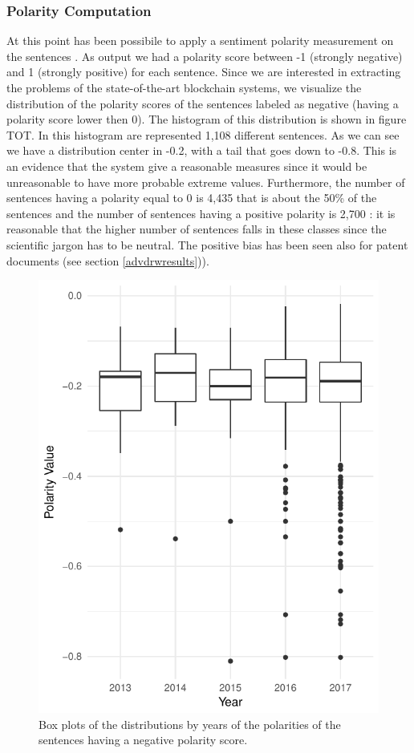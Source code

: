 \documentclass[]{book}
\begin{document}
\subsubsection*{Polarity Computation}\label{polarity-computation}

At this point has been possibile to apply a sentiment polarity
measurement on the sentences \citep{sentimentr2018}. As output we had a
polarity score between -1 (strongly negative) and 1 (strongly positive)
for each sentence. Since we are interested in extracting the problems of
the state-of-the-art blockchain systems, we visualize the distribution
of the polarity scores of the sentences labeled as negative (having a
polarity score lower then 0). The histogram of this distribution is
shown in figure TOT. In this histogram are represented 1,108 different
sentences. As we can see we have a distribution center in -0.2, with a
tail that goes down to -0.8. This is an evidence that the system give a
reasonable measures since it would be unreasonable to have more probable
extreme values. Furthermore, the number of sentences having a polarity
equal to 0 is 4,435 that is about the 50\% of the sentences and the
number of sentences having a positive polarity is 2,700 : it is
reasonable that the higher number of sentences falls in these classes
since the scientific jargon has to be neutral. The positive bias has
been seen also for patent documents (see section \ref{advdrwresults})).

\begin{figure}

{\centering \includegraphics[width=0.8\linewidth]{_bookdown_files/figures/polarity_histogram_time_bl} 

}

\caption{Box plots of the distributions  by years of the polarities of the sentences having a negative polarity score.}\label{fig:sentintimebl}
\end{figure}
\end{document}
